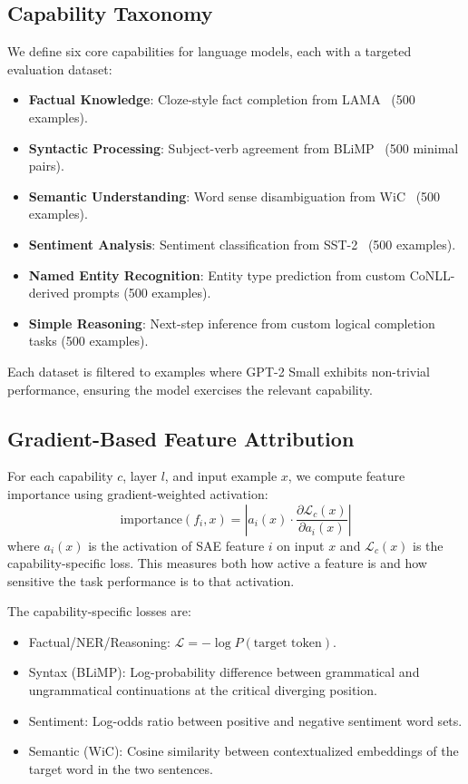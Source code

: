 \documentclass{article}
\begin{document}
\subsection{Capability Taxonomy}

We define six core capabilities for language models, each with a targeted evaluation dataset:

\begin{itemize}
    \item \textbf{Factual Knowledge}: Cloze-style fact completion from LAMA~\citep{petroni2019language} (500 examples).
    \item \textbf{Syntactic Processing}: Subject-verb agreement from BLiMP~\citep{warstadt2020blimp} (500 minimal pairs).
    \item \textbf{Semantic Understanding}: Word sense disambiguation from WiC~\citep{pilehvar2019wic} (500 examples).
    \item \textbf{Sentiment Analysis}: Sentiment classification from SST-2~\citep{socher2013recursive} (500 examples).
    \item \textbf{Named Entity Recognition}: Entity type prediction from custom CoNLL-derived prompts (500 examples).
    \item \textbf{Simple Reasoning}: Next-step inference from custom logical completion tasks (500 examples).
\end{itemize}

Each dataset is filtered to examples where GPT-2 Small exhibits non-trivial performance, ensuring the model exercises the relevant capability.

\subsection{Gradient-Based Feature Attribution}

For each capability $c$, layer $l$, and input example $x$, we compute feature importance using gradient-weighted activation:
\begin{equation}
    \text{importance}(f_i, x) = \left| a_i(x) \cdot \frac{\partial \mathcal{L}_c(x)}{\partial a_i(x)} \right|
    \label{eq:attribution}
\end{equation}
where $a_i(x)$ is the activation of SAE feature $i$ on input $x$ and $\mathcal{L}_c(x)$ is the capability-specific loss. This measures both how active a feature is and how sensitive the task performance is to that activation.

The capability-specific losses are:
\begin{itemize}
    \item Factual/NER/Reasoning: $\mathcal{L} = -\log P(\text{target token})$.
    \item Syntax (BLiMP): Log-probability difference between grammatical and ungrammatical continuations at the critical diverging position.
    \item Sentiment: Log-odds ratio between positive and negative sentiment word sets.
    \item Semantic (WiC): Cosine similarity between contextualized embeddings of the target word in the two sentences.
\end{itemize}
\end{document}
